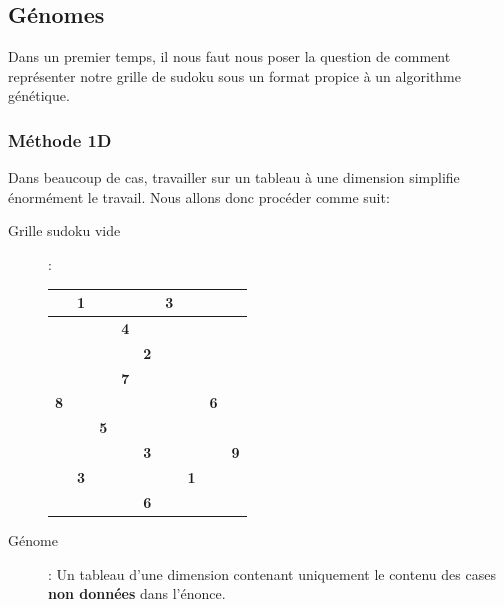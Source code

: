         \subsection{Génomes}
            Dans un premier temps, il nous faut nous poser la question de comment représenter notre grille de sudoku sous un format propice à un algorithme génétique.\\
            \subsubsection{Méthode 1D}
                Dans beaucoup de cas, travailler sur un tableau à une dimension simplifie énormément le travail. Nous allons donc procéder comme suit:
                \begin{description}
                    \item[Grille sudoku vide]:\\
                        \begin{center}
                            \begin{tabular}{|c|c|c| |c|c|c| |c|c|c|}
                                \hline
                                &\textbf{1}&&&&\textbf{3}&&&\\
                                \hline
                                &&&\textbf{4}&&&&&\\
                                \hline
                                &&&&\textbf{2}&&&&\\
                                \hline
                                \hline
                                &&&\textbf{7}&&&&&\\
                                \hline
                                \textbf{8}&&&&&&&\textbf{6}&\\
                                \hline
                                &&\textbf{5}&&&&&&\\
                                \hline
                                \hline
                                &&&&\textbf{3}&&&&\textbf{9}\\
                                \hline
                                &\textbf{3}&&&&&\textbf{1}&&\\
                                \hline
                                &&&&\textbf{6}&&&&\\
                                \hline
                            \end    {tabular}
                        \end{center}
                    \item[G\'enome]: Un tableau d'une dimension contenant uniquement le contenu des cases \textbf{non données} dans l'énonce.
                \end{description}
